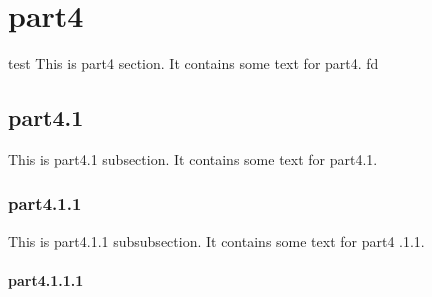 \section{part4} 
test
This is part4 section. It contains some text for part4.    
fd 
\subsection{part4.1}
This is part4.1 subsection. It contains some text for part4.1.
\subsubsection{part4.1.1}
This is part4.1.1 subsubsection. It contains some text for part4
.1.1.
\paragraph{part4.1.1.1}